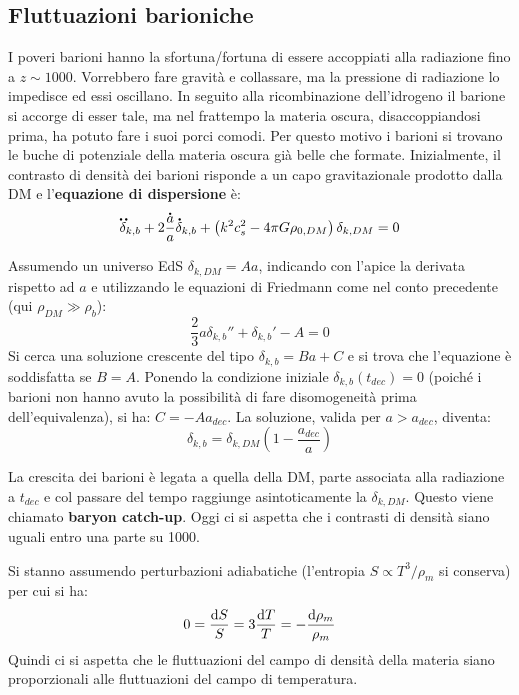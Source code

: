 \subsection{Fluttuazioni barioniche}
I poveri barioni hanno la sfortuna/fortuna di essere accoppiati alla radiazione fino a $z\sim 1000$.  Vorrebbero fare gravità e collassare, ma la pressione di radiazione lo impedisce ed essi oscillano. In seguito alla ricombinazione dell'idrogeno il barione si accorge di esser tale, ma nel frattempo la materia oscura, disaccoppiandosi prima, ha potuto fare i suoi porci comodi. Per questo motivo i barioni si trovano le buche di potenziale della materia oscura già belle che formate. Inizialmente, il contrasto di densità dei barioni risponde a un capo gravitazionale prodotto dalla DM e l'\textbf{equazione di dispersione} è:
\begin{equation}
    \accentset{\mbox{\large\bfseries ..}}{\delta}_{k,b}+ 2 \frac{\accentset{\mbox{\large\bfseries .}}{a}}{a}\accentset{\mbox{\large\bfseries .}}{\delta}_{k,b} + \left( k^2 c_s^2 -4\pi G \rho_{0,DM}\right)\delta_{k,DM}  =0
\end{equation}

Assumendo un universo EdS $\delta_{k,DM}=Aa$, indicando con l'apice la derivata rispetto ad $a$ e utilizzando le equazioni di Friedmann come nel conto precedente (qui $\rho_{DM}\gg\rho_{b}$):
\begin{equation*}
    \frac{2}{3}a\delta_{k,b}''+\delta_{k,b}' -A=0
\end{equation*}
Si cerca una soluzione crescente del tipo $\delta_{k,b}=Ba+C$ e si trova che l'equazione è soddisfatta se $B=A$. Ponendo la condizione iniziale $\delta_{k,b}(t_{dec})=0$ (poiché i barioni non hanno avuto la possibilità di fare disomogeneità prima dell'equivalenza), si ha: $C=-Aa_{dec}$. La soluzione, valida per $a>a_{dec}$, diventa:
$$
\delta_{k,b}=\delta_{k,DM}\left(1-\frac{a_{dec}}{a}\right)
$$

La crescita dei barioni è legata a quella della DM, parte associata alla radiazione a $t_{dec}$ e col passare del tempo raggiunge asintoticamente la $\delta_{k,DM}$. Questo viene chiamato \textbf{baryon catch-up}. Oggi ci si aspetta che i contrasti di densità siano uguali entro una parte su 1000. 

Si stanno assumendo perturbazioni adiabatiche (l'entropia $S\propto T^3/\rho_m$ si conserva) per cui si ha:
$$
0=\frac{\operatorname{d}\!{S}}{S}=3 \frac{\operatorname{d}\!{T}}{T}=-\frac{\operatorname{d}\!{\rho_m}}{\rho_m}
$$
Quindi ci si aspetta che le fluttuazioni del campo di densità della materia siano proporzionali alle fluttuazioni del campo di temperatura. 

